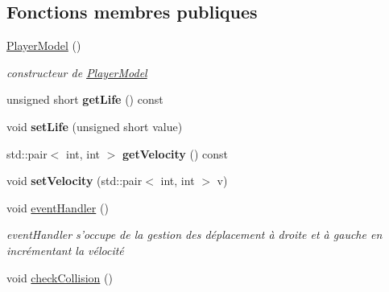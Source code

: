 \subsection*{Fonctions membres publiques}
\begin{DoxyCompactItemize}
\item 
\hyperlink{class_player_model_a10b23d720ce628b505b259d268f54d80}{Player\+Model} ()
\begin{DoxyCompactList}\small\item\em constructeur de \hyperlink{class_player_model}{Player\+Model} \end{DoxyCompactList}\item 
\hypertarget{class_player_model_a9937451bb701d0840cfb76b5ae20ccb5}{unsigned short {\bfseries get\+Life} () const }\label{class_player_model_a9937451bb701d0840cfb76b5ae20ccb5}

\item 
\hypertarget{class_player_model_aba8af8580b750937a429043d73318266}{void {\bfseries set\+Life} (unsigned short value)}\label{class_player_model_aba8af8580b750937a429043d73318266}

\item 
\hypertarget{class_player_model_af8d1309ae3399c58f3b18f67f3988b6a}{std\+::pair$<$ int, int $>$ {\bfseries get\+Velocity} () const }\label{class_player_model_af8d1309ae3399c58f3b18f67f3988b6a}

\item 
\hypertarget{class_player_model_a690686ebf5c13228b1a0c989916fbebe}{void {\bfseries set\+Velocity} (std\+::pair$<$ int, int $>$ v)}\label{class_player_model_a690686ebf5c13228b1a0c989916fbebe}

\item 
\hypertarget{class_player_model_a2d5888a16c98c37e739d2785a6895672}{void \hyperlink{class_player_model_a2d5888a16c98c37e739d2785a6895672}{event\+Handler} ()}\label{class_player_model_a2d5888a16c98c37e739d2785a6895672}

\begin{DoxyCompactList}\small\item\em event\+Handler s'occupe de la gestion des déplacement à droite et à gauche en incrémentant la vélocité \end{DoxyCompactList}\item 
\hypertarget{class_player_model_aaa594348007aff887dde9056c69117ac}{void \hyperlink{class_player_model_aaa594348007aff887dde9056c69117ac}{check\+Collision} ()}\label{class_player_model_aaa594348007aff887dde9056c69117ac}


\end{DoxyCompactItemize}
